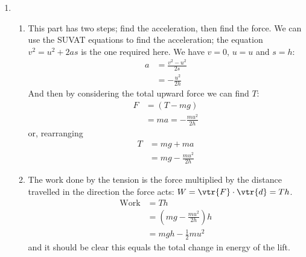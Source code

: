 \begin{problem}[HE+_Lift]
{\begin{enumerate}
\begin{enumerate}
	\item The work done by the tension is the force multiplied by the distance travelled in the direction the force acts: $W = \vtr{F}\cdot\vtr{d} = -Th$ (as the tension acts in the opposite direction to the distance).
	\begin{align*} \textrm{Work} &= -Th \\&= -\left(mg + \frac{mu^{2}}{2h}\right)h \\ &= - mgh - \frac{1}{2}mu^{2} \end{align*}
and it should be clear this equals the total change in energy of the lift.
\end{enumerate}
\item 
\begin{enumerate} 
\item This part has two steps; find the acceleration, then find the force. We can use the SUVAT equations to find the acceleration; the equation $v^{2} = u^{2} + 2as$ is the one required here. We have $v = 0$, $u = u$ and $s = h$:
\begin{align*} a &= \frac{v^{2} - u^{2}}{2s} \\ &= -\frac{u^{2}}{2h} \end{align*}
And then by considering the total upward force we can find $T$:
\begin{align*} F &= (T - mg) \\ &= ma = -\frac{mu^{2}}{2h} \end{align*}
or, rearranging \begin{align*} T &= mg + ma \\ &= mg - \frac{mu^{2}}{2h} \end{align*}
	\item The work done by the tension is the force multiplied by the distance travelled in the direction the force acts: $W = \vtr{F}\cdot\vtr{d} = Th$.
	\begin{align*} \textrm{Work} &= Th \\&= \left(mg - \frac{mu^{2}}{2h}\right)h \\ &= mgh - \frac{1}{2}mu^{2} \end{align*}
and it should be clear this equals the total change in energy of the lift. 
\end{enumerate}
\end{enumerate}}
\end{problem}